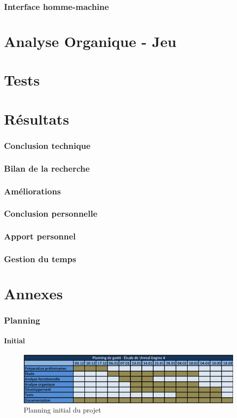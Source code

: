 \documentclass[11pt, a4paper, oneside]{article}
\begin{document}
\section{Interface homme-machine}
\newpage
\part{Analyse Organique - Jeu}
\newpage
\part{Tests}
\newpage
\part{Résultats} 
\section{Conclusion technique}
\section{Bilan de la recherche}
\section{Améliorations}
\section{Conclusion personnelle}
\section{Apport personnel}
\section{Gestion du temps}
\newpage
\part{Annexes}
\section{Planning}
\subsection{Initial}
\begin{figure}[h]
	\begin{center}
	\includegraphics[scale=.924, angle=90]{planninggantt}
	\caption{Planning initial du projet}
	\label{planningintial}
	\end{center}
\end{figure}
\newpage
\end{document}
